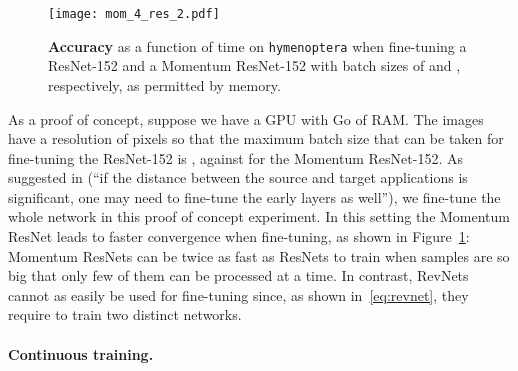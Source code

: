 \documentclass{article}
\begin{document}
\begin{figure}[H]
\begin{minipage}[c]{0.55\linewidth}
        \texttt{[image: mom\_4\_res\_2.pdf]}
    \end{minipage}\hfill
    \begin{minipage}[c]{0.42\linewidth}
        \vspace{-1em}
    \caption{\textbf{Accuracy} as a function of time on \texttt{hymenoptera} when fine-tuning a ResNet-152 and a Momentum ResNet-152 with batch sizes of  and , respectively, as permitted by memory. }\label{fig:fine_tuning}
    \end{minipage}
\end{figure}
\vspace{-1em}
As a proof of concept, suppose we have a GPU with  Go of RAM. The images have a resolution of  pixels so that the maximum batch size that can be taken for fine-tuning the ResNet-152 is , against  for the Momentum ResNet-152.  As suggested in \citet{tajbakhsh2016convolutional} (“if the distance between the source and target applications is significant, one may need to fine-tune the early layers as well”), we fine-tune the whole network in this proof of concept experiment.  In this setting the Momentum ResNet leads to faster convergence when fine-tuning, as shown in Figure~\ref{fig:fine_tuning}: Momentum ResNets can be twice as fast as ResNets to train when samples are so big that only few of them can be processed at a time.  In contrast, RevNets \citep{gomez2017reversible} cannot as easily be used for fine-tuning since, as shown in~\eqref{eq:revnet}, they require to train two distinct networks.

\paragraph{Continuous training.} 
\end{document}

